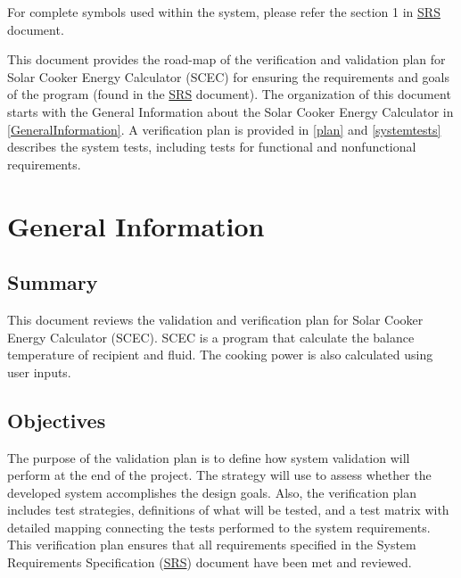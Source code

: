 \documentclass[12pt, titlepage]{article}
\begin{document}
For complete symbols used within the system, please refer the section 1 in 
  \href{https://github.com/DeeshaPatel/CAS-741-Solar-Cooker/blob/7c53c8d9a19ca2f94dfba6ba9208eae0bf03b8cc/docs/SRS/SRS.pdf}{SRS} document.


\newpage


This document provides the road-map of the verification and validation plan for Solar Cooker Energy Calculator (SCEC) for ensuring the requirements and goals of the program (found in the \href{https://github.com/DeeshaPatel/CAS-741-Solar-Cooker/blob/7c53c8d9a19ca2f94dfba6ba9208eae0bf03b8cc/docs/SRS/SRS.pdf}{SRS} document). The organization of this document starts with the General Information about the Solar Cooker Energy Calculator in \autoref{GeneralInformation}. A verification plan is provided in \autoref{plan} and \autoref{systemtests} describes the system tests, including tests for functional and nonfunctional requirements.
  

\section{General Information}
\label{GeneralInformation}

\subsection{Summary}

This document reviews the validation and verification plan for Solar Cooker Energy Calculator (SCEC). SCEC is a program that calculate the balance temperature of recipient and fluid. The cooking power is also calculated using user inputs.  

\subsection{Objectives}

The purpose of the validation plan is to define how system validation will perform at the end of the project. The strategy will use to assess whether the developed system accomplishes the design goals. Also, the verification plan includes test strategies, definitions of what will be tested, and a test matrix with detailed mapping connecting the tests performed to the system requirements. This verification plan ensures that all requirements specified in the System Requirements Specification (\href{https://github.com/DeeshaPatel/CAS-741-Solar-Cooker/blob/7c53c8d9a19ca2f94dfba6ba9208eae0bf03b8cc/docs/SRS/SRS.pdf}{SRS}) document have been met and reviewed.
\end{document}
